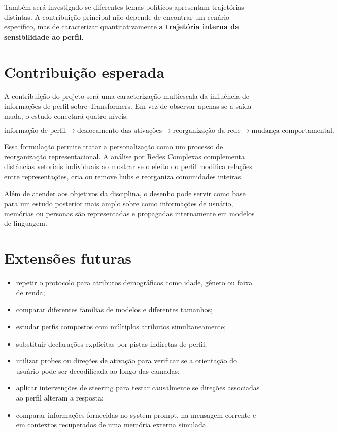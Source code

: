 \documentclass[11pt,a4paper]{article}
\begin{document}
Também será investigado se diferentes temas políticos apresentam trajetórias distintas. A contribuição principal não depende de encontrar um cenário específico, mas de caracterizar quantitativamente \textbf{a trajetória interna da sensibilidade ao perfil}.

\section{Contribuição esperada}

A contribuição do projeto será uma caracterização multiescala da influência de informações de perfil sobre Transformers. Em vez de observar apenas se a saída muda, o estudo conectará quatro níveis:

\[
\boxed{\text{informação de perfil}}
\longrightarrow
\boxed{\text{deslocamento das ativações}}
\longrightarrow
\boxed{\text{reorganização da rede}}
\longrightarrow
\boxed{\text{mudança comportamental}}.
\]

Essa formulação permite tratar a personalização como um processo de reorganização representacional. A análise por Redes Complexas complementa distâncias vetoriais individuais ao mostrar se o efeito do perfil modifica relações entre representações, cria ou remove hubs e reorganiza comunidades inteiras.

Além de atender aos objetivos da disciplina, o desenho pode servir como base para um estudo posterior mais amplo sobre como informações de usuário, memórias ou personas são representadas e propagadas internamente em modelos de linguagem.

\section{Extensões futuras}

\begin{itemize}
    \item repetir o protocolo para atributos demográficos como idade, gênero ou faixa de renda;
    \item comparar diferentes famílias de modelos e diferentes tamanhos;
    \item estudar perfis compostos com múltiplos atributos simultaneamente;
    \item substituir declarações explícitas por pistas indiretas de perfil;
    \item utilizar probes ou direções de ativação para verificar se a orientação do usuário pode ser decodificada ao longo das camadas;
    \item aplicar intervenções de steering para testar causalmente se direções associadas ao perfil alteram a resposta;
    \item comparar informações fornecidas no system prompt, na mensagem corrente e em contextos recuperados de uma memória externa simulada.
\end{itemize}
\end{document}
